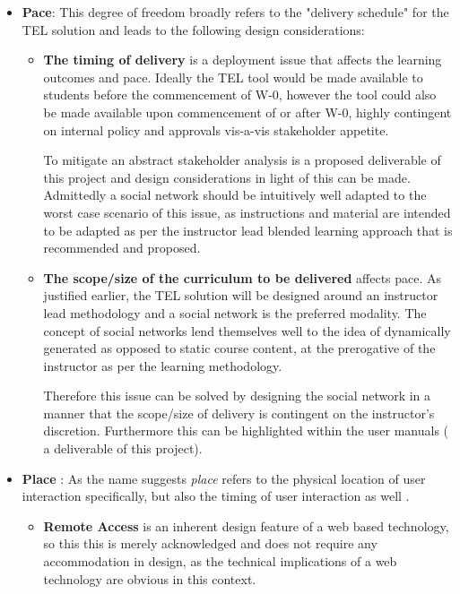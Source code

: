 \begin{itemize}[\null]

\item \textbf{Pace}: This degree of freedom broadly refers to the  "delivery schedule" \cite{Gordon2014} for the TEL solution and leads to the following design considerations:

\begin{itemize}
\item \textbf{The timing of delivery} is a deployment issue that affects the learning outcomes and pace. Ideally the TEL tool would be made available to students before the commencement of W-0, however the tool could also be made available upon commencement of or after W-0, highly contingent on internal policy and approvals vis-a-vis stakeholder appetite.

To mitigate an abstract stakeholder analysis is a proposed deliverable of this project and design considerations in light of this can be made. Admittedly a social network should be intuitively well adapted to the worst case scenario of this issue, as instructions and material are intended to be adapted as per the instructor lead blended learning approach that is recommended and proposed.

\item \textbf{The scope/size of the curriculum to be delivered} affects pace. As justified earlier, the TEL solution will be designed around an instructor lead methodology and a social network is the preferred modality. The concept of social networks lend themselves  well to the idea of dynamically generated as opposed to static course content, at the prerogative of the instructor as per the learning methodology.

Therefore this issue can be solved by designing the social network in a manner that the scope/size of delivery is contingent on the instructor's discretion. Furthermore this can be highlighted within the user manuals ( a deliverable of this project).

\end{itemize}

\item \textbf{Place} : As the name suggests \textit{place} refers to the physical location of user interaction specifically, but also the timing of user interaction as well \cite{Gordon2014}.

\begin{itemize}

\item \textbf{Remote Access} is an inherent design feature of a web based technology, so this this is merely acknowledged and does not require any accommodation in design, as the technical implications of a web technology are obvious in this context.



\end{itemize}
\end{itemize}
